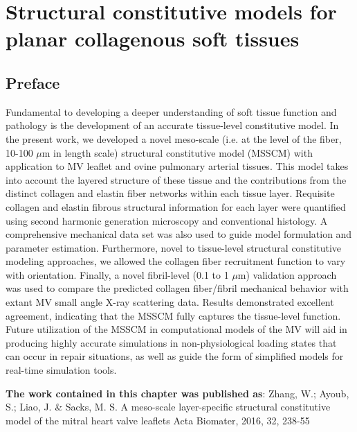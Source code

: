 \chapter{Structural constitutive models for planar collagenous soft tissues}


\section*{Preface}
%

    Fundamental to developing a deeper understanding of soft tissue function and pathology is the development of an accurate tissue-level constitutive model. In the present work, we developed a novel meso-scale (i.e. at the level of the fiber, 10-100 $\mu$m in length scale) structural constitutive model (MSSCM) with application to MV leaflet and ovine pulmonary arterial tissues. This model takes into account the layered structure of these tissue and the contributions from the distinct collagen and elastin fiber networks within each tissue layer. Requisite collagen and elastin fibrous structural information for each layer were quantified using second harmonic generation microscopy and conventional histology. A comprehensive mechanical data set was also used to guide model formulation and parameter estimation. Furthermore, novel to tissue-level structural constitutive modeling approaches, we allowed the collagen fiber recruitment function to vary with orientation. Finally, a novel fibril-level (0.1 to 1 $\mu$m) validation approach was used to compare the predicted collagen fiber/fibril mechanical behavior with extant MV small angle X-ray scattering data. Results demonstrated excellent agreement, indicating that the MSSCM fully captures the tissue-level function. Future utilization of the MSSCM in computational models of the MV will aid in producing highly accurate simulations in non-physiological loading states that can occur in repair situations, as well as guide the form of simplified models for real-time simulation tools.

\textbf{The work contained in this chapter was published as}:  Zhang, W.; Ayoub, S.; Liao, J. \& Sacks, M. S.
A meso-scale layer-specific structural constitutive model of the mitral heart valve leaflets 
Acta Biomater, 2016, 32, 238-55 
























